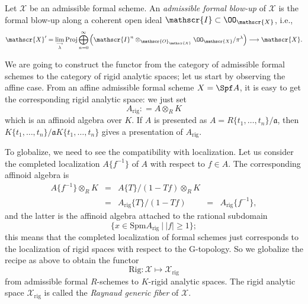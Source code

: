 \begin{appdfn}
Let $\mathscr{X}$ be an admissible formal scheme.
An {\it admissible formal blow-up} of $\mathscr{X}$ is the formal blow-up
along a coherent open ideal $\mathscr{I}\subset\OO_{\mathscr{X}}$, i.e., 
\begin{equation*}
 \mathscr{X}'=\lim_{\stackrel{\longrightarrow}{\lambda}}\mathrm{Proj}
 \bigoplus^{\infty}_{n=0}\left(\mathscr{I}^n\otimes_{\mathscr{O}_{\mathscr{X}}}
 \OO_{\mathscr{X}}/\pi^{\lambda}\right)\longrightarrow\mathscr{X}.
\end{equation*}
\end{appdfn}

We are going to construct the functor from the category of admissible 
formal schemes to the category of rigid analytic spaces; let us start 
by observing the affine case.
From an affine admissible formal scheme $X=\Spf A$, it is easy to
get the corresponding rigid analytic space: we just set 
\begin{equation*}
 A_{\mathrm{rig}}\colon=A\otimes_RK
\end{equation*}
which is an affinoid algebra over $K$.
If $A$ is presented as $A=R\{t_1,\ldots,t_n\}/\mathfrak{a}$, then
$K\{t_1,\ldots,t_n\}/\mathfrak{a}K\{t_1,\ldots,t_n\}$ gives a presentation
of $A_{\mathrm{rig}}$.

To globalize, we need to see the compatibility with localization.
Let us consider the completed localization $A\{f^{-1}\}$ of $A$ with
respect to $f\in A$.
The corresponding affinoid algebra is
\begin{equation*}
 \begin{array}{ccccl}
 A\{f^{-1}\}\otimes_RK&=&A\{T\}/(1-Tf)\otimes_RK\\
 &=&A_{\mathrm{rig}}\{T\}/(1-Tf)&=&A_{\mathrm{rig}}\{f^{-1}\},
 \end{array}
\end{equation*}
and the latter is the affinoid algebra attached to the
rational subdomain
\begin{equation*}
 \{x\in\mathrm{Spm}A_{\mathrm{rig}}\ |\ |f|\geq 1\};
\end{equation*}
this means that the completed localization of formal schemes just 
corresponds to the localization of rigid spaces with respect to the
G-topology.
So we globalize the recipe as above to obtain the functor
\begin{equation*}
 \mathrm{Rig}\colon\mathscr{X}\mapsto\mathscr{X}_{\mathrm{rig}}
\end{equation*}
from admissible formal $R$-schemes to $K$-rigid analytic spaces.
The rigid analytic space $\mathscr{X}_{\mathrm{rig}}$ is called the
{\it Raynaud generic fiber} of $\mathscr{X}$.

